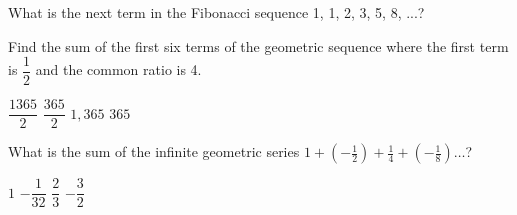 \begin{questions}
\question What is the next term in the Fibonacci sequence 1, 1, 2, 3, 5, 8, ...?    
\begin{multicols}{4}
\begin{choices}  
\end{choices}
\end{multicols} 

\question Find the sum of the first six terms of the geometric sequence where the first term is $\dfrac{1}{2}$ and the common ratio is 4. 
\begin{multicols}{4}
\begin{choices} 
\CorrectChoice $\dfrac{1365}{2}$
\choice $\dfrac{365}{2}$
\choice $1,365$
\choice $365$
\end{choices}
\end{multicols} 

\question What is the sum of the infinite geometric series $\displaystyle 1+(-\frac{1}{2})+\frac{1}{4}+(-\frac{1}{8})\ldots$? 
\begin{multicols}{4}
\begin{choices}  
\choice $1$
\choice $-\dfrac{1}{32}$
\CorrectChoice $\dfrac{2}{3}$
\choice $-\dfrac{3}{2}$
\end{choices}
\end{multicols} 

\end{questions}